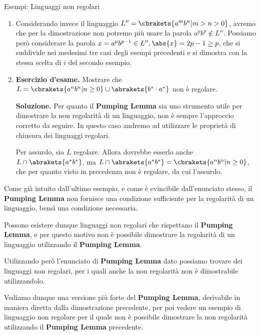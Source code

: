 \begin{generalbox}[colframe=azure-gradient-3!90!black]{Esempi: Linguaggi non regolari}
\begin{enumerate}
          \medskip

    \item Considerando invece il linguaggio \( L'' = \cbrakets{a^{m}b^n \vert m > n > 0}\), avremo che per la dimostrazione non potremo più usare la parola \(a^{p}b^{p} \nin L''\). Possiamo però considerare la parola \( x=a^{p}b^{p-1} \in L'', \abs{x}=2p-1\geq p\), che si suddivide nei medesimi tre casi degli esempi precedenti e si dimostra con la stessa scelta di \(i\) del secondo esempio.

          \medskip

    \item \textbf{Esercizio d'esame. } Mostrare che \(L = \cbrakets{a^{n}b^{n} \vert n \geq 0} \cup \abrakets{b^*\cdot a^*}\) non è regolare.

          \medskip

          \textbf{Soluzione. } Per quanto il \textbf{Pumping Lemma} sia uno strumento utile per dimostrare la non regolarità di un linguaggio, non è sempre l'approccio corretto da seguire. In questo caso andremo ad utilizzare le proprietà di chiusura dei linguaggi regolari.

          \medskip

          Per assurdo, sia \(L\) regolare. Allora dovrebbe esserlo anche \(L \cap \abrakets{a^*b^*}\), ma \(L \cap \abrakets{a^*b^*} = \cbrakets{a^{n}b^{n} \vert n \geq 0}\), che per quanto visto in precedenza non è regolare, da cui l'assurdo.
  \end{enumerate}

\end{generalbox}

Come già intuito dall'ultimo esempio, e come è evincibile dall'enunciato stesso, il \textbf{Pumping Lemma} non fornisce una condizione sufficiente per la regolarità di un linguaggio, bensì una condizione necessaria.

Possono esistere dunque linguaggi non regolari che rispettano il \textbf{Pumping Lemma}, e per questo motivo non è possibile dimostrare la regolarità di un linguaggio utilizzando il \textbf{Pumping Lemma}.

Utilizzando però l'enunciato di \textbf{Pumping Lemma} dato possiamo trovare dei linguaggi non regolari, per i quali anche la non regolarità non è dimostrabile utilizzandolo.

Vediamo dunque una versione più forte del \textbf{Pumping Lemma}, derivabile in maniera diretta dalla dimostrazione precedente, per poi vedere un esempio di linguaggio non regolare per il quale non è possibile dimostrare la non regolarità utilizzando il \textbf{Pumping Lemma} precedente.

